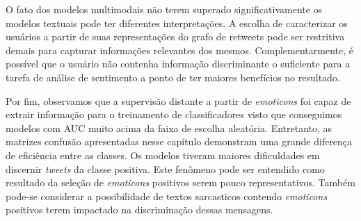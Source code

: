O fato dos modelos multimodais não terem superado significativamente os modelos
textuais pode ter diferentes interpretações.
A escolha de caracterizar os usuários a partir de suas representações do grafo
de retweets pode ser restritiva demais para capturar informações relevantes dos
mesmos.
Complementarmente, é possível que o usuário não contenha informação discriminante
o suficiente para a tarefa de análise de sentimento a ponto de ter maiores
benefícios no resultado.

Por fim, observamos que a supervisão distante a partir de \textit{emoticons} foi
capaz de extrair informação para o treinamento de classificadores visto que
conseguimos modelos com AUC muito acima da faixa de escolha aleatória.
Entretanto, as matrizes confusão apresentadas nesse capítulo demonstram uma
grande diferença de eficiência entre as classes.
Os modelos tiveram maiores dificuldades em discernir \textit{tweets} da classe
positiva.
Este fenômeno pode ser entendido como resultado da seleção de \textit{emoticons}
positivos serem pouco representativos.
Também pode-se considerar a possibilidade de textos sarcasticos contendo
\textit{emoticons} positivos terem impactado na discriminação dessas mensagens.


